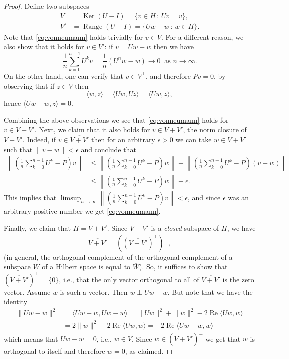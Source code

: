 \documentclass[12pt]{article}
\theoremstyle{example}
\begin{document}
\begin{proof}
Define two subspaces
\begin{align*}
V&=\operatorname{Ker}(U-I) = \{ v\in H\,:\, Uv=v \}, \\
V'&=\operatorname{Range}(U-I) = \{ Uw-w \,:\, w\in H \}.
\end{align*}
Note that \eqref{eq:vonneumann} holds trivially for $v\in V$. For a different reason, we also show that it holds for $v\in V'$: if $v=Uw-w$ then we have
$$
\frac{1}{n}\sum_{k=0}^{n-1} U^k v  = \frac{1}{n}\left( U^n w - w \right) \to 0\ \textrm{ as }n\to\infty.
$$
On the other hand, one can verify that $v\in V^\perp$, and therefore $Pv=0$, by observing that if $z\in V$ then
$$ \langle w, z \rangle = \langle Uw,Uz \rangle = 
\langle Uw,z\rangle,
$$
hence $\langle Uw-w,z\rangle = 0$.

Combining the above observations we see that \eqref{eq:vonneumann} holds for $v\in V+V'$. Next, we claim that it also holds for $v\in \overline{V+V'}$, the norm closure of $V+V'$. Indeed, if $v\in \overline{V+V'}$ then for an arbitrary $\epsilon>0$ we can take $w\in V+V'$ such that $\lVert v-w\rVert < \epsilon$ and conclude that
\begin{align*}
\left\lVert \left(\frac{1}{n}\sum_{k=0}^{n-1} U^k-P\right)v \right\rVert
& \le
\left\lVert \left(\frac{1}{n}\sum_{k=0}^{n-1} U^k-P\right)w \right\rVert
+ 
\left\lVert \left(\frac{1}{n}\sum_{k=0}^{n-1} U^k-P\right)(v-w) \right\rVert
\\ & \le
\left\lVert \left(\frac{1}{n}\sum_{k=0}^{n-1} U^k-P\right)w \right\rVert
+  \epsilon.
\end{align*}
This implies that $\limsup_{n\to\infty}
\left\lVert \left(\frac{1}{n}\sum_{k=0}^{n-1} U^k-P\right)v \right\rVert < \epsilon$, and since $\epsilon$ was an arbitrary positive number we get \eqref{eq:vonneumann}.

Finally, we claim that $H=\overline{V+V'}$. Since $\overline{V+V'}$ is a \emph{closed} subspace of $H$, we have 
$$\overline{V+V'} = \left( \left(\overline{V+V'}\right)^\perp \right)^\perp, $$
(in general, the orthogonal complement of the orthogonal complement of a subspace $W$ of a Hilbert space is equal to $\overline{W}$).
So, it suffices to show that $\left(\overline{V+V'}\right)^\perp=\{0\}$, i.e., that the only vector orthogonal to all of $\overline{V+V'}$ is the zero vector. Assume $w$ is such a vector. Then $w \perp Uw-w$. But note that we have the identity
\begin{align*}
\lVert Uw-w \rVert^2 &= \langle Uw-w, Uw-w\rangle = \lVert Uw \rVert^2 + \lVert w \rVert^2 - 2\operatorname{Re} \langle Uw,w\rangle  \\ &=
2\lVert w \rVert^2 - 2\operatorname{Re} \langle Uw,w\rangle
= - 2\operatorname{Re} \langle Uw-w,w\rangle
\end{align*}
which means that $Uw-w = 0$, i.e., $w\in V$. Since $w\in \left(\overline{V+V'}\right)^\perp$ we get that $w$ is orthogonal to itself and therefore $w=0$, as claimed.
\end{proof}
\end{document}
